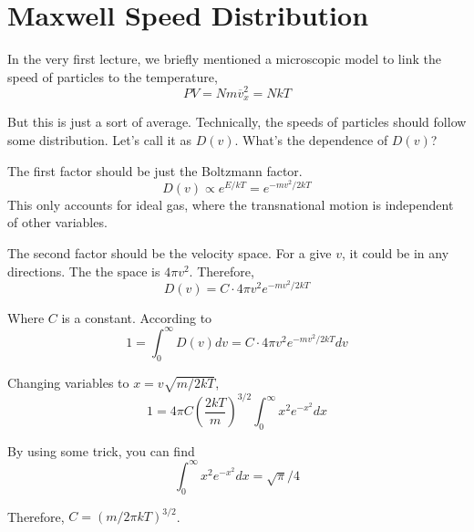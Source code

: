 
\section{Maxwell Speed Distribution}
In the very first lecture, we briefly mentioned a microscopic model to link the speed of particles to the temperature,
\begin{equation} \label{PV-micro} PV = Nm{\overline v_x^2} = NkT\end{equation}

But this is just a sort of average. Technically, the speeds of particles should follow some distribution.
Let's call it as $D(v)$. What's the dependence of $D(v)$?

The first factor should be just the Boltzmann factor. 
\begin{equation}
D(v) \propto e^{E/kT} = e^{-mv^2/2kT}
\end{equation}
This only accounts for ideal gas, where the transnational motion is independent of other variables.

The second factor should be the velocity space. For a give $v$, it could be in any directions. The the space is $4\pi v^2$.
Therefore,
\begin{equation}
D(v) = C \cdot 4\pi v^2 e^{-mv^2/2kT}
\end{equation}

Where $C$ is a constant. According to 
\begin{equation}
1 = \int _0 ^{\infty} D(v)dv  = C \cdot 4\pi v^2 e^{-mv^2/2kT} dv
\end{equation}

Changing variables to $x = v\sqrt{m/2kT}$,
\begin{equation}
1 =  4\pi C (\frac{2kT}{m})^{3/2}  \int _0 ^{\infty} x^2 e^{-x^2} dx
\end{equation}

By using some trick, you can find
\begin{equation}
\int _0 ^{\infty} x^2 e^{-x^2} dx = \sqrt{\pi}/4
\end{equation}

Therefore, $C=(m/2\pi kT)^{3/2}$.

